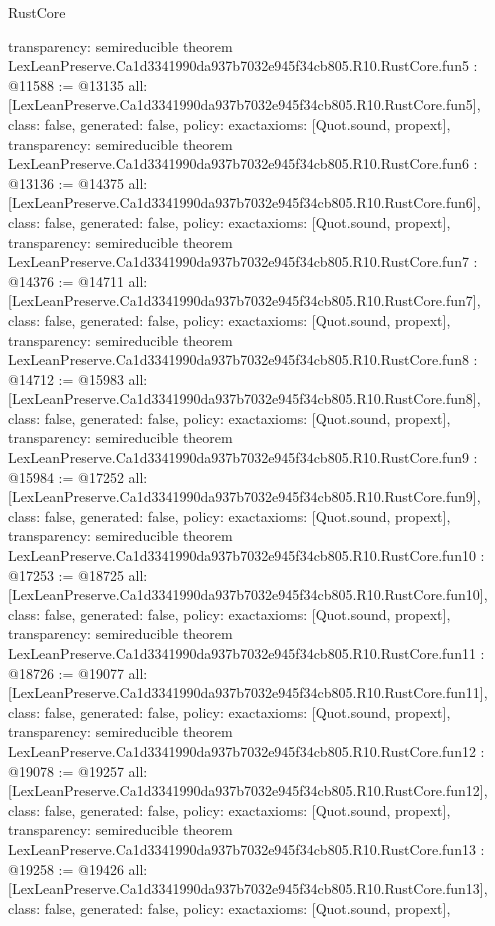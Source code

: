 \begin{lexlean}{RustCore}
\begin{coremodule}
{  transparency: semireducible
}
theorem LexLeanPreserve.Ca1d3341990da937b7032e945f34cb805.R10.RustCore.fun5 : @11588 := @13135 {
  all: [LexLeanPreserve.Ca1d3341990da937b7032e945f34cb805.R10.RustCore.fun5],
  class: false,
  generated: false,
  policy: exact{axioms: [Quot.sound, propext]},
  transparency: semireducible
}
theorem LexLeanPreserve.Ca1d3341990da937b7032e945f34cb805.R10.RustCore.fun6 : @13136 := @14375 {
  all: [LexLeanPreserve.Ca1d3341990da937b7032e945f34cb805.R10.RustCore.fun6],
  class: false,
  generated: false,
  policy: exact{axioms: [Quot.sound, propext]},
  transparency: semireducible
}
theorem LexLeanPreserve.Ca1d3341990da937b7032e945f34cb805.R10.RustCore.fun7 : @14376 := @14711 {
  all: [LexLeanPreserve.Ca1d3341990da937b7032e945f34cb805.R10.RustCore.fun7],
  class: false,
  generated: false,
  policy: exact{axioms: [Quot.sound, propext]},
  transparency: semireducible
}
theorem LexLeanPreserve.Ca1d3341990da937b7032e945f34cb805.R10.RustCore.fun8 : @14712 := @15983 {
  all: [LexLeanPreserve.Ca1d3341990da937b7032e945f34cb805.R10.RustCore.fun8],
  class: false,
  generated: false,
  policy: exact{axioms: [Quot.sound, propext]},
  transparency: semireducible
}
theorem LexLeanPreserve.Ca1d3341990da937b7032e945f34cb805.R10.RustCore.fun9 : @15984 := @17252 {
  all: [LexLeanPreserve.Ca1d3341990da937b7032e945f34cb805.R10.RustCore.fun9],
  class: false,
  generated: false,
  policy: exact{axioms: [Quot.sound, propext]},
  transparency: semireducible
}
theorem LexLeanPreserve.Ca1d3341990da937b7032e945f34cb805.R10.RustCore.fun10 : @17253 := @18725 {
  all: [LexLeanPreserve.Ca1d3341990da937b7032e945f34cb805.R10.RustCore.fun10],
  class: false,
  generated: false,
  policy: exact{axioms: [Quot.sound, propext]},
  transparency: semireducible
}
theorem LexLeanPreserve.Ca1d3341990da937b7032e945f34cb805.R10.RustCore.fun11 : @18726 := @19077 {
  all: [LexLeanPreserve.Ca1d3341990da937b7032e945f34cb805.R10.RustCore.fun11],
  class: false,
  generated: false,
  policy: exact{axioms: [Quot.sound, propext]},
  transparency: semireducible
}
theorem LexLeanPreserve.Ca1d3341990da937b7032e945f34cb805.R10.RustCore.fun12 : @19078 := @19257 {
  all: [LexLeanPreserve.Ca1d3341990da937b7032e945f34cb805.R10.RustCore.fun12],
  class: false,
  generated: false,
  policy: exact{axioms: [Quot.sound, propext]},
  transparency: semireducible
}
theorem LexLeanPreserve.Ca1d3341990da937b7032e945f34cb805.R10.RustCore.fun13 : @19258 := @19426 {
  all: [LexLeanPreserve.Ca1d3341990da937b7032e945f34cb805.R10.RustCore.fun13],
  class: false,
  generated: false,
  policy: exact{axioms: [Quot.sound, propext]},
}
\end{coremodule}
\end{lexlean}
